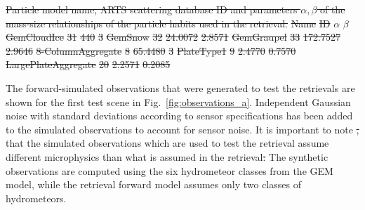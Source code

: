 \documentclass[journal abbreviation, manuscript]{copernicus}
\providecommand{\DIFadd}[1]{{\protect\color{blue}\uwave{#1}}} %
\providecommand{\DIFdel}[1]{{\protect\color{red}\sout{#1}}}                      %
\providecommand{\DIFaddbegin}{} %
\providecommand{\DIFaddend}{} %
\providecommand{\DIFdelbegin}{} %
\providecommand{\DIFdelend}{} %
\providecommand{\DIFdelFL}[1]{\DIFdel{#1}} %
\begin{document}
\DIFdelbegin %
{%
\DIFdelFL{Particle model name, ARTS scattering database ID and parameters
    $\alpha, \beta$ of the mass-size relationships of the particle habits used
    in the retrieval.}}
\DIFdelFL{Name }%
\DIFdelFL{ID }%
\DIFdelFL{$\alpha$ }%
\DIFdelFL{$\beta$ }%
\DIFdelFL{GemCloudIce         }%
\DIFdelFL{31  }%
\DIFdelFL{440      }%
\DIFdelFL{3 }%
\DIFdelFL{GemSnow             }%
\DIFdelFL{32  }%
\DIFdelFL{24.0072  }%
\DIFdelFL{2.8571 }%
\DIFdelFL{GemGraupel          }%
\DIFdelFL{33  }%
\DIFdelFL{172.7527 }%
\DIFdelFL{2.9646 }%
\DIFdelFL{8-ColumnAggregate   }%
\DIFdelFL{8  }%
\DIFdelFL{65.4480  }%
\DIFdelFL{3      }%
\DIFdelFL{PlateType1          }%
\DIFdelFL{9  }%
\DIFdelFL{2.4770   }%
\DIFdelFL{0.7570 }%
\DIFdelFL{LargePlateAggregate }%
\DIFdelFL{20 }%
\DIFdelFL{2.2571   }%
\DIFdelFL{0.2085 }%

\DIFdelend The forward-simulated observations that were generated to test the retrievals
are shown for the first test scene in Fig.~\ref{fig:observations_a}. Independent
Gaussian noise with standard deviations according to sensor specifications has
been added to the simulated observations to account for sensor noise. It is
important to note \DIFdelbegin \DIFdel{, }\DIFdelend that the simulated observations which are used to test the
retrieval assume different microphysics than what is assumed in the retrieval\DIFdelbegin \DIFdel{:
}\DIFdelend \DIFaddbegin \DIFadd{.
}\DIFaddend The synthetic observations are computed using the six hydrometeor classes from
the GEM model, while the retrieval forward model assumes only two classes of
hydrometeors.
\end{document}
